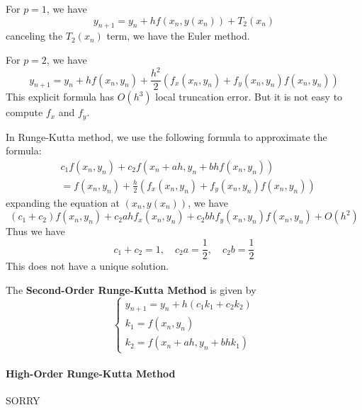 \documentclass{matharticle}
\begin{document}
For $p=1$, we have
\begin{equation*}
	y_{n+1} = y_n + h f(x_n, y(x_n)) + T_2(x_n)
\end{equation*}
canceling the $T_2(x_n)$ term, we have the Euler method.

For $p=2$, we have
\begin{equation*}
	y_{n+1} = y_n + h f(x_n, y_n) + \frac{h^2}{2} (f_x(x_n, y_n) + f_y(x_n, y_n) f(x_n, y_n))
\end{equation*}
This explicit formula has $O(h^3)$ local truncation error. But it is not easy to compute $f_x$ and $f_y$.

In Runge-Kutta method, we use the following formula to approximate the formula:
\begin{equation*}
	\begin{aligned}
		 & c_1 f(x_n, y_n) + c_2 f(x_n + a h, y_n + b h f(x_n, y_n))               \\
		 & = f(x_n, y_n) + \frac{h}{2} (f_x(x_n, y_n) + f_y(x_n, y_n) f(x_n, y_n))
	\end{aligned}
\end{equation*}
expanding the equation at $(x_n, y(x_n))$, we have
\begin{equation*}
	(c_1 + c_2) f(x_n, y_n) + c_2 a h f_x(x_n, y_n) + c_2 b h f_y(x_n, y_n) f(x_n, y_n) + O(h^2)
\end{equation*}
Thus we have
\begin{equation}
	c_1 + c_2 = 1, \quad c_2 a = \frac{1}{2}, \quad c_2 b = \frac{1}{2}
\end{equation}
This does not have a unique solution.

The \textbf{Second-Order Runge-Kutta Method} is given by
\begin{equation}
	\begin{cases}
		y_{n+1} = y_n + h (c_1 k_1 + c_2 k_2) \\
		k_1 = f(x_n, y_n)                     \\
		k_2 = f(x_n + a h, y_n + b h k_1)
	\end{cases}
\end{equation}

\paragraph{High-Order Runge-Kutta Method}
SORRY
\end{document}
